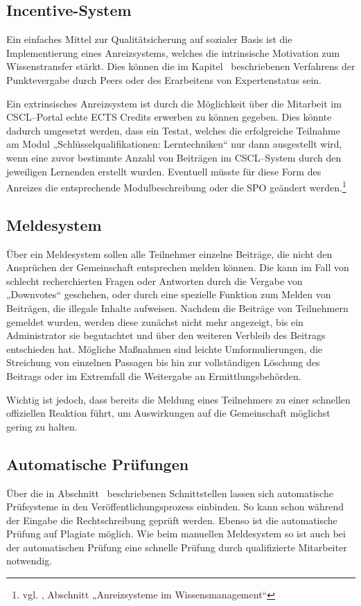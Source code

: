 \subsection{Incentive-System} %
\label{sub:incentive_system}
Ein einfaches Mittel zur Qualitätsicherung auf sozialer Basis ist die Implementierung eines Anreizsystems, welches die intrinsische Motivation zum Wissenstransfer stärkt. Dies können die im Kapitel~ beschriebenen Verfahrens der Punktevergabe durch Peers oder des Erarbeitens von Expertenstatus sein.

Ein extrinsisches Anreizsystem ist durch die Möglichkeit über die Mitarbeit im \ac{CSCL}–Portal echte \ac{ECTS} Credits erwerben zu können gegeben. Dies könnte dadurch umgesetzt werden, dass ein Testat, welches die erfolgreiche Teilnahme am Modul „Schlüsselqualifikationen: Lerntechniken“ nur dann ausgestellt wird, wenn eine zuvor bestimmte Anzahl von Beiträgen im \ac{CSCL}–System durch den jeweiligen Lernenden erstellt wurden. Eventuell müsste für diese Form des Anreizes die entsprechende Modulbeschreibung oder die \ac{SPO} geändert werden.\footnote{vgl. \cite{beuth:anreiz}, Abschnitt „Anreizsysteme im Wissensmanagement“}

\subsection{Meldesystem} %
\label{sub:meldesystem}
Über ein Meldesystem sollen alle Teilnehmer einzelne Beiträge, die nicht den Ansprüchen der Gemeinschaft entsprechen melden können. Die kann im Fall von schlecht recherchierten Fragen oder Antworten durch die Vergabe von „Downvotes“ geschehen, oder durch eine spezielle Funktion zum Melden von Beiträgen, die illegale Inhalte aufweisen. Nachdem die Beiträge von Teilnehmern gemeldet wurden, werden diese zunächst nicht mehr angezeigt, bis ein Administrator sie begutachtet und über den weiteren Verbleib des Beitrags entschieden hat. Mögliche Maßnahmen sind leichte Umformulierungen, die Streichung von einzelnen Passagen bis hin zur vollständigen Löschung des Beitrags oder im Extremfall die Weitergabe an Ermittlungsbehörden.

Wichtig ist jedoch, dass bereits die Meldung eines Teilnehmers zu einer schnellen offiziellen Reaktion führt, um Auswirkungen auf die Gemeinschaft möglichst gering zu halten.

\subsection{Automatische Prüfungen} %
\label{sub:prufung_auf_plagiate}
Über die in Abschnitt~ beschriebenen Schnittstellen lassen sich automatische Prüfsysteme in den Veröffentlichungsprozess einbinden. So kann schon während der Eingabe die Rechtschreibung geprüft werden. Ebenso ist die automatische Prüfung auf Plagiate möglich. Wie beim manuellen Meldesystem so ist auch bei der automatischen Prüfung eine schnelle Prüfung durch qualifizierte Mitarbeiter notwendig.

